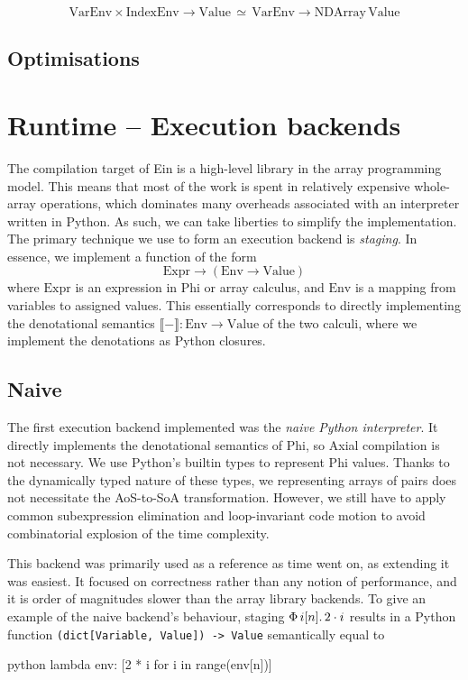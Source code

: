 $$ \mathrm{VarEnv} \times \mathrm{IndexEnv} \to \mathrm{Value} \,\simeq\, \mathrm{VarEnv} \to \mathrm{NDArray}\, \mathrm{Value} $$

\todothis


\subsection{Optimisations}

\todothis

\section{Runtime -- Execution backends}

The compilation target of Ein is a high-level library in the array programming model. This means that most of the work is spent in relatively expensive whole-array operations, which dominates many overheads associated with an interpreter written in Python. As such, we can take liberties to simplify the implementation. The primary technique we use to form an execution backend is \textit{staging}. In essence, we implement a function of the form
$$ \mathrm{Expr} \to \left( \mathrm{Env} \to \mathrm{Value} \right) $$
where $\mathrm{Expr}$ is an expression in Phi or array calculus, and $\mathrm{Env}$ is a mapping from variables to assigned values. This essentially corresponds to directly implementing the denotational semantics $\llbracket - \rrbracket : \mathrm{Env} \to \mathrm{Value}$ of the two calculi, where we implement the denotations as Python closures.

\subsection{Naive}

The first execution backend implemented was the \textit{naive Python interpreter}. It directly implements the denotational semantics of Phi, so Axial compilation is not necessary. We use Python's builtin types to represent Phi values. Thanks to the dynamically typed nature of these types, we representing arrays of pairs does not necessitate the AoS-to-SoA transformation. However, we still have to apply common subexpression elimination and loop-invariant code motion to avoid combinatorial explosion of the time complexity.

This backend was primarily used as a reference as time went on, as extending it was easiest. It focused on correctness rather than any notion of performance, and it is order of magnitudes slower than the array library backends. To give an example of the naive backend's behaviour, staging $\Phi\, {i}[{n}] \ldotp {2 \cdot i}$ results in a Python function \texttt{(dict[Variable, Value]) -> Value} semantically equal to
\begin{center}
\begin{cminted}{python}
lambda env: [2 * i for i in range(env[n])]
\end{cminted}    
\end{center}

